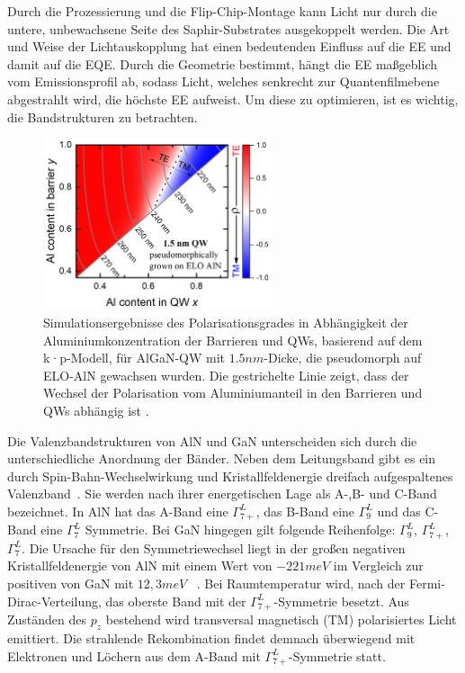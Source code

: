 \vspace{0.1cm}
\noindent
Durch die Prozessierung und die Flip-Chip-Montage kann Licht nur durch die untere, unbewachsene Seite des Saphir-Substrates ausgekoppelt werden. Die Art und Weise der Lichtauskopplung hat einen bedeutenden Einfluss auf die EE und damit auf die EQE. Durch die Geometrie bestimmt, hängt die EE maßgeblich vom Emissionsprofil ab, sodass Licht, welches senkrecht zur Quantenfilmebene abgestrahlt wird, die höchste EE aufweist. 
Um diese zu optimieren, ist es wichtig, die Bandstrukturen zu betrachten.
%
\begin{figure}[htb]
  \centering
  \begin{minipage}{\linewidth}
      \centering
        \includegraphics[width=0.6\textwidth]{Bilder/christophPolarisationSimu.png}
      \caption{Simulationsergebnisse des Polarisationsgrades in Abhängigkeit der Aluminiumkonzentration der Barrieren und QWs, basierend auf
dem k·p-Modell, für AlGaN-QW mit $1.5nm$-Dicke, die pseudomorph auf ELO-AlN gewachsen wurden. Die gestrichelte Linie zeigt, dass der Wechsel der Polarisation vom Aluminiumanteil in den Barrieren und QWs abhängig ist \cite{doi:10.1063/1.4932651}.}
      \label{fig:simuchr}
  \end{minipage}
\end{figure}
%
Die Valenzbandstrukturen von AlN und GaN unterscheiden sich durch die unterschiedliche Anordnung der Bänder. Neben dem Leitungsband gibt es ein durch Spin-Bahn-Wechselwirkung und Kristallfeldenergie dreifach aufgespaltenes Valenzband~\cite{doi:10.1063/1.117689}. Sie werden nach ihrer energetischen Lage als A-,B- und C-Band bezeichnet. In AlN hat das A-Band eine $\Gamma^{L}_{7+}$, das B-Band eine $\Gamma^{L}_{9}$ und das C-Band eine $\Gamma^{L}_{7}$ Symmetrie. Bei GaN hingegen gilt folgende Reihenfolge:  $\Gamma^{L}_{9}$, $\Gamma^{L}_{7+}$, $\Gamma^{L}_{7}$. Die Ursache für den Symmetriewechsel liegt in der großen negativen Kristallfeldenergie von AlN mit einem Wert von $-221meV$ \cite{PhysRevB.87.235209} im Vergleich zur positiven von GaN mit $12,3meV$ ~\cite{PhysRevB.81.155202}. Bei Raumtemperatur wird, nach der Fermi-Dirac-Verteilung, das oberste Band mit der $\Gamma^{L}_{7+}$-Symmetrie besetzt. Aus Zuständen des $p_z$ bestehend wird transversal magnetisch (TM) polarisiertes Licht emittiert. Die strahlende Rekombination findet demnach überwiegend mit Elektronen und Löchern aus dem A-Band mit $\Gamma^{L}_{7+}$-Symmetrie statt.

